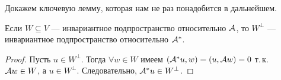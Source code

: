 Докажем ключевую лемму, которая нам не раз понадобится в дальнейшем.

\begin{lemma}[Важная]
    Если $W \subseteq V$ --- инвариантное подпространство относительно $\mathcal{A}$, то $W^\perp$ --- инвариантное подпространство относительно $\mathcal{A}^\ast$.
\end{lemma}

\begin{proof}
    Пусть $u \in W^\perp$. Тогда $\forall w \in W$ имеем $(\mathcal{A}^\ast u, w) = (u, \mathcal{A} w) = 0$ т.\,к. $\mathcal{A} w \in W$, а $u \in W^\perp$. Следовательно, $\mathcal{A}^\ast u \in W^\perp$.
\end{proof}

